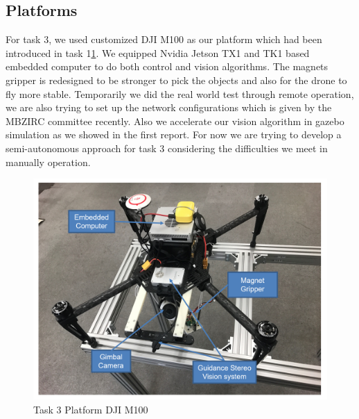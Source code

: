 \documentclass{standalone}
\begin{document}
\subsection{Platforms}
For task 3, we used customized DJI M100 as our platform which had been introduced in task 1\ref{task3platform}. We equipped Nvidia Jetson TX1 and TK1 based embedded computer to do both control and vision algorithms. The magnets gripper is redesigned to be stronger to pick the objects and also for the drone to fly more stable. Temporarily we did the real world test through remote operation, we are also trying to set up the network configurations which is given by the MBZIRC committee recently. Also we accelerate our vision algorithm in gazebo simulation as we showed in the first report. For now we are trying to develop a semi-autonomous approach for task 3 considering the difficulties we meet in manually operation.
 \begin{figure}%
    \begin{center}
    \includegraphics[keepaspectratio=true, width=1\linewidth, height=0.3\textheight]
    {sections//task3//images//task3platform.png}
      \end{center}
    \caption{Task 3 Platform DJI M100}
    \label{task3platform}
    \end{figure}
    
\end{document}

